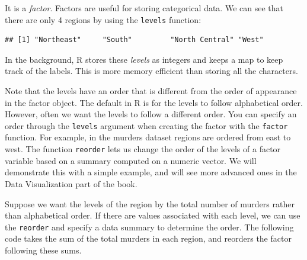 \documentclass[
]{article}
\newenvironment{Shaded}{\begin{snugshade}}{\end{snugshade}}
\newcommand{\AttributeTok}[1]{\textcolor[rgb]{0.13,0.29,0.53}{#1}}
\newcommand{\FunctionTok}[1]{\textcolor[rgb]{0.13,0.29,0.53}{\textbf{#1}}}
\newcommand{\NormalTok}[1]{#1}
\newcommand{\OtherTok}[1]{\textcolor[rgb]{0.56,0.35,0.01}{#1}}
\newcommand{\SpecialCharTok}[1]{\textcolor[rgb]{0.81,0.36,0.00}{\textbf{#1}}}
\begin{document}
It is a \emph{factor}. Factors are useful for storing categorical data.
We can see that there are only 4 regions by using the \texttt{levels}
function:

\begin{Shaded}
\end{Shaded}

\begin{verbatim}
## [1] "Northeast"     "South"         "North Central" "West"
\end{verbatim}

In the background, R stores these \emph{levels} as integers and keeps a
map to keep track of the labels. This is more memory efficient than
storing all the characters.

Note that the levels have an order that is different from the order of
appearance in the factor object. The default in R is for the levels to
follow alphabetical order. However, often we want the levels to follow a
different order. You can specify an order through the \texttt{levels}
argument when creating the factor with the \texttt{factor} function. For
example, in the murders dataset regions are ordered from east to west.
The function \texttt{reorder} lets us change the order of the levels of
a factor variable based on a summary computed on a numeric vector. We
will demonstrate this with a simple example, and will see more advanced
ones in the Data Visualization part of the book.

Suppose we want the levels of the region by the total number of murders
rather than alphabetical order. If there are values associated with each
level, we can use the \texttt{reorder} and specify a data summary to
determine the order. The following code takes the sum of the total
murders in each region, and reorders the factor following these sums.

\begin{Shaded}
\end{Shaded}
\end{document}
